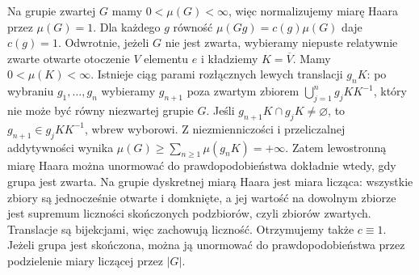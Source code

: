 \begin{przyklad}
\label{ex:haar-compact-discrete-23}
Na grupie zwartej $G$ mamy $0<\mu(G)<\infty$,
więc normalizujemy miarę Haara przez $\mu(G)=1$.
Dla każdego $g$ równość $\mu(Gg)=c(g)\mu(G)$
daje $c(g)=1$.
Odwrotnie, jeżeli $G$ nie jest zwarta, wybieramy niepuste
relatywnie zwarte otwarte otoczenie $V$ elementu $e$
i kładziemy $K=\overline V$. Mamy $0<\mu(K)<\infty$.
Istnieje ciąg parami rozłącznych lewych translacji $g_nK$:
po wybraniu $g_1,\ldots,g_n$ wybieramy $g_{n+1}$ poza
zwartym zbiorem $\bigcup_{j=1}^n g_jKK^{-1}$, który nie
może być równy niezwartej grupie $G$. Jeśli
$g_{n+1}K\cap g_jK\ne\varnothing$, to
$g_{n+1}\in g_jKK^{-1}$, wbrew wyborowi.
Z niezmienniczości i przeliczalnej addytywności wynika
$\mu(G)\ge\sum_{n\ge1}\mu(g_nK)=+\infty$.
Zatem lewostronną miarę Haara można unormować do
prawdopodobieństwa dokładnie wtedy, gdy grupa jest zwarta.
Na grupie dyskretnej miarą Haara jest miara licząca:
wszystkie zbiory są jednocześnie otwarte i domknięte,
a jej wartość na dowolnym zbiorze jest supremum
liczności skończonych podzbiorów, czyli zbiorów zwartych.
Translacje są bijekcjami, więc zachowują liczność.
Otrzymujemy także $c\equiv1$. Jeżeli grupa jest skończona,
można ją unormować do prawdopodobieństwa przez
podzielenie miary liczącej przez $|G|$.
\end{przyklad}

